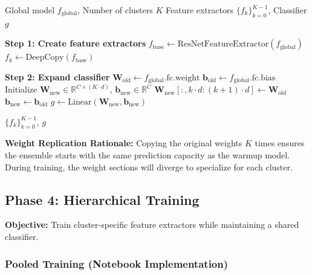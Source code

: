 \documentclass[11pt,a4paper]{article}
\newcommand{\R}{\mathbb{R}}
\begin{document}
\begin{algorithm}
\caption{Ensemble Initialization}
\begin{algorithmic}[1]
\Require Global model $f_{\text{global}}$, Number of clusters $K$
\Ensure Feature extractors $\{f_k\}_{k=0}^{K-1}$, Classifier $g$

\State \textbf{Step 1: Create feature extractors}
\State $f_{\text{base}} \gets \text{ResNetFeatureExtractor}(f_{\text{global}})$
    \State $f_k \gets \text{DeepCopy}(f_{\text{base}})$
\EndFor

\State \textbf{Step 2: Expand classifier}
\State $\mathbf{W}_{\text{old}} \gets f_{\text{global}}.\text{fc.weight}$ 
\State $\mathbf{b}_{\text{old}} \gets f_{\text{global}}.\text{fc.bias}$ 
\State Initialize $\mathbf{W}_{\text{new}} \in \R^{C \times (K \cdot d)}$, $\mathbf{b}_{\text{new}} \in \R^C$
    \State $\mathbf{W}_{\text{new}}[:, k \cdot d : (k+1) \cdot d] \gets \mathbf{W}_{\text{old}}$
\EndFor
\State $\mathbf{b}_{\text{new}} \gets \mathbf{b}_{\text{old}}$
\State $g \gets \text{Linear}(\mathbf{W}_{\text{new}}, \mathbf{b}_{\text{new}})$

\State \Return $\{f_k\}_{k=0}^{K-1}$, $g$
\end{algorithmic}
\end{algorithm}

\textbf{Weight Replication Rationale:} Copying the original weights $K$ times ensures the ensemble starts with the same prediction capacity as the warmup model. During training, the weight sections will diverge to specialize for each cluster.

\subsection{Phase 4: Hierarchical Training}

\textbf{Objective:} Train cluster-specific feature extractors while maintaining a shared classifier.

\subsubsection{Pooled Training (Notebook Implementation)}
\end{document}
